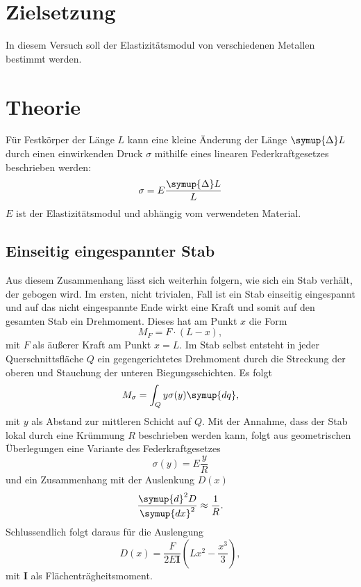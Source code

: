 \section{Zielsetzung}
In diesem Versuch soll der Elastizitätsmodul von verschiedenen Metallen bestimmt werden.
\section{Theorie}
\label{sec:Theorie}
Für Festkörper der Länge $L$ kann eine kleine Änderung der Länge $\symup{\Delta}L$
durch einen einwirkenden Druck $\sigma$
mithilfe eines linearen Federkraftgesetzes beschrieben werden:
\begin{equation}
    \sigma = E\frac{\symup{\Delta}L}{L}
\end{equation}
$E$ ist der Elastizitätsmodul und abhängig vom verwendeten Material.
\subsection{Einseitig eingespannter Stab}
Aus diesem Zusammenhang lässt sich weiterhin folgern, wie sich ein Stab verhält, der gebogen wird.
Im ersten, nicht trivialen, Fall ist ein Stab einseitig eingespannt und auf das nicht eingespannte
Ende wirkt eine Kraft und somit auf den gesamten Stab ein Drehmoment.
Dieses hat am Punkt $x$ die Form
\begin{equation}
    M_F = F\cdot(L-x),
\end{equation}
mit $F$ als äußerer Kraft am Punkt $x=L$.
Im Stab selbst entsteht in jeder Querschnittsfläche $Q$ ein gegengerichtetes Drehmoment durch die
Streckung der oberen und Stauchung der unteren Biegungsschichten.
Es folgt
\begin{equation}
    M_\sigma = \int_Q y \sigma(y) \symup{dq},
\end{equation}
mit $y$ als Abstand zur mittleren Schicht auf $Q$.
Mit der Annahme, dass der Stab lokal durch eine Krümmung $R$ beschrieben werden kann,
folgt aus geometrischen Überlegungen eine Variante des Federkraftgesetzes
\begin{equation}
    \sigma(y) = E\frac{y}{R}
\end{equation}
und ein Zusammenhang mit der Auslenkung $D(x)$
\begin{equation}
    \frac{\symup{d}^2D}{\symup{dx}^2} \approx \frac{1}{R}.
\end{equation}
Schlussendlich folgt daraus für die Auslengung
\begin{equation}
    D(x) = \frac{F}{2E\symbf{I}}\left(Lx^2-\frac{x^3}{3}\right),
\end{equation}
mit $\symbf{I}$ als Flächenträgheitsmoment.
